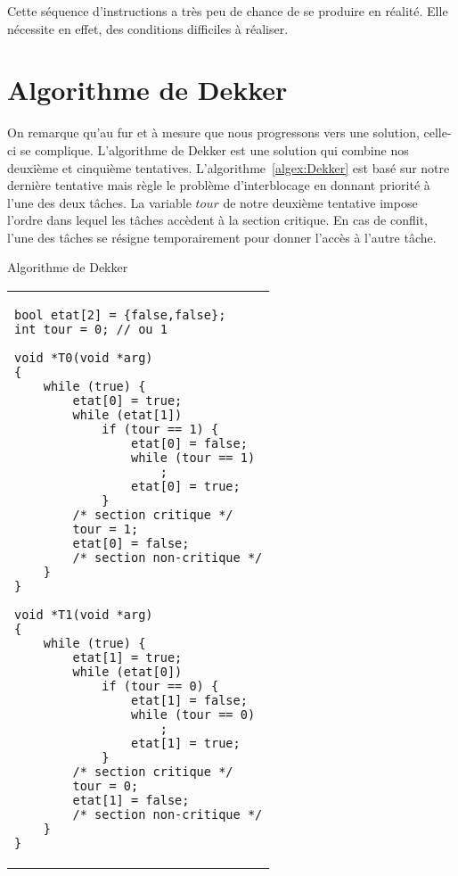 \par\noindent
Cette séquence d'instructions a très peu de chance de se produire en réalité. Elle nécessite en effet, des conditions difficiles à réaliser.

\section{Algorithme de Dekker}
On remarque qu'au fur et à mesure que nous progressons vers une solution, celle-ci se complique. L'algorithme de Dekker est une solution qui combine nos deuxième et cinquième tentatives.
L'algorithme~\ref{algex:Dekker} est basé sur notre dernière tentative mais règle le problème d'interblocage en donnant priorité à l'une des deux tâches.  La variable $tour$ de notre deuxième tentative impose l'ordre dans lequel les tâches accèdent à la section critique.  En cas de conflit, l'une des tâches se résigne temporairement pour donner l'accès à l'autre tâche.
\begin{algorithm}[!ht]
\caption{Algorithme de Dekker}\label{algex:Dekker}
\centering
\begin{tabular}{l}
\lstset{language=C++}
\begin{lstlisting}
bool etat[2] = {false,false};
int tour = 0; // ou 1

void *T0(void *arg)
{
	while (true) {
		etat[0] = true;
		while (etat[1])
			if (tour == 1) {
				etat[0] = false;
				while (tour == 1)
					;
				etat[0] = true;
			}
		/* section critique */
		tour = 1;
		etat[0] = false;
		/* section non-critique */
	}
}

void *T1(void *arg)
{
	while (true) {
		etat[1] = true;
		while (etat[0])
			if (tour == 0) {
				etat[1] = false;
				while (tour == 0)
					;
				etat[1] = true;
			}
		/* section critique */
		tour = 0;
		etat[1] = false;
		/* section non-critique */
	}
}
\end{lstlisting}
\end{tabular}

\end{algorithm}

